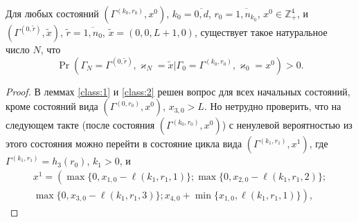 \documentclass[a4paper,12pt,russian]{extarticle}
\begin{document}
\begin{lemma}
Для любых состояний $(\Gamma^{(k_0,r_0)},x^0)$, $k_0=\overline{0,d}$, $r_0=\overline{1,n_{k_0}}$, $x^0 \in \mathbb{Z}_+^4$, и $(\Gamma^{(0,\tilde{r})},\tilde{x})$, $\tilde{r} = \overline{1,n_0}$, $\tilde{x}=(0,0,L+1,0)$, существует такое натуральное число $N$, что 
\begin{equation*}
\Pr(\Gamma_{N}=\Gamma^{(0,\tilde{r} )}, \varkappa_{N}=\tilde{x}|
\Gamma_{0}=\Gamma^{(k_0,r_0)}, \varkappa_{0}=x^0)>0.
\end{equation*}
\label{all:in:one}
\end{lemma}
\begin{proof}
В леммах \eqref{class:1} и \eqref{class:2} решен вопрос для всех начальных состояний, кроме состояний вида $(\Gamma^{(0,r_0)},x^0)$, $x_{3,0}>L$. Но нетрудно проверить, что на следующем такте (после состояния $(\Gamma^{(k_0,r_0)},x^0)$) с ненулевой вероятностью из этого состояния можно перейти в состояние цикла вида $(\Gamma^{(k_1,r_1)},x^1)$, где $\Gamma^{(k_1,r_1)} = h_3(r_0)$, $k_1>0$, и 
\begin{multline*}
x^{1}=\left(\max{\{0,x_{1,0} - \ell(k_1,r_1,1)\}};
\max{\{0,x_{2,0} - \ell(k_1,r_1,2)\}};\right.\\
\left.
\max{\{0,x_{3,0} - \ell(k_1,r_1,3)\}};
x_{4,0} + \min{\{x_{1,0}, \ell(k_1,r_1,1)\}}\right),
\end{multline*}



\end{proof}
\end{document}
